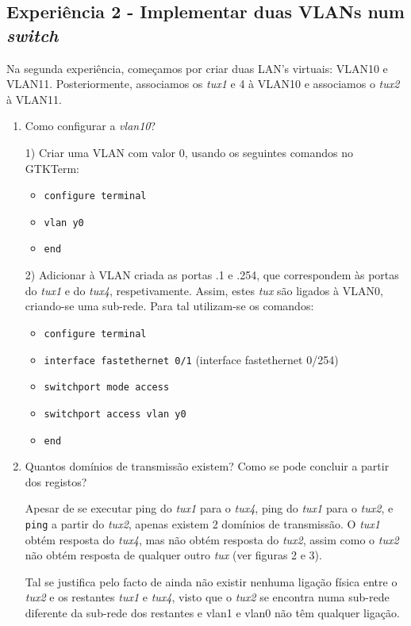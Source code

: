 \documentclass{article}
\begin{document}
\subsection{Experiência 2 - Implementar duas VLANs num \textit{switch}}

Na segunda experiência, começamos por criar duas LAN’s virtuais: VLAN10 e VLAN11. Posteriormente, associamos os \textit{tux1} e 4 à VLAN10 e associamos o \textit{tux2} à VLAN11.

\begin{enumerate}
\item Como configurar a \textit{vlan10}?

1) Criar uma VLAN com valor 0, usando os seguintes comandos no GTKTerm:
\begin{itemize}
    \item \texttt{configure terminal}
    \item \texttt{vlan y0}
    \item \texttt{end}
\end{itemize}
2) Adicionar à VLAN criada as portas .1 e .254, que correspondem às portas do \textit{tux1} e do \textit{tux4}, respetivamente. Assim, estes \textit{tux} são ligados à VLAN0, criando-se uma sub-rede. Para tal utilizam-se os comandos:
\begin{itemize}
    \item \texttt{configure terminal}
    \item \texttt{interface fastethernet 0/1}  (interface fastethernet 0/254)
    \item \texttt{switchport mode access}
    \item \texttt{switchport access vlan y0}
    \item \texttt{end}
\end{itemize}

\item Quantos domínios de transmissão existem? Como se pode concluir a partir dos registos?

Apesar de se executar ping do \textit{tux1} para o \textit{tux4}, ping do \textit{tux1} para o \textit{tux2}, e \texttt{ping} a partir do \textit{tux2}, apenas existem 2 domínios de transmissão. O \textit{tux1} obtém resposta do \textit{tux4}, mas não obtém resposta do \textit{tux2}, assim como o \textit{tux2} não obtém resposta de qualquer outro \textit{tux} (ver figuras 2 e 3). 

Tal se justifica pelo facto de ainda não existir nenhuma ligação física entre o \textit{tux2} e os restantes \textit{tux1} e \textit{tux4}, visto que o \textit{tux2} se encontra numa sub-rede diferente da sub-rede dos restantes e vlan1 e vlan0 não têm qualquer ligação.

\end{enumerate}
\end{document}
